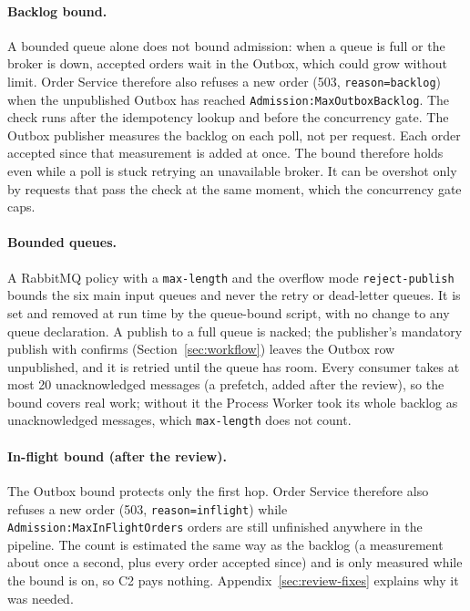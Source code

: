 \documentclass[a4paper]{report}
\begin{document}
\paragraph{Backlog bound.} A bounded queue alone does not bound admission:
when a queue is full or the broker is down, accepted orders wait in the
Outbox, which could grow without limit. Order Service therefore also refuses a
new order (503, \texttt{reason=backlog}) when the unpublished Outbox has
reached \texttt{Admission:\allowbreak MaxOutboxBacklog}. The check runs after
the idempotency lookup and before the concurrency gate. The Outbox publisher
measures the backlog on each poll, not per request. Each order accepted since that measurement
is added at once. The bound therefore
holds even while a poll is stuck retrying an unavailable broker. It can be
overshot only by requests that pass the check at the same moment, which the
concurrency gate caps.

\paragraph{Bounded queues.} A RabbitMQ policy with a
\texttt{max-length} and the overflow mode \texttt{reject-publish}~\cite{rmq-maxlength} bounds the six main input queues and never
the retry or dead-letter queues. It is set and removed at run time by
the queue-bound script, with no change to any queue declaration.
A publish to a full queue is nacked; the publisher's mandatory publish with
confirms (Section~\ref{sec:workflow}) leaves the Outbox row unpublished, and it
is retried until the queue has room. Every consumer takes at most 20
unacknowledged messages (a prefetch, added after the review), so the bound
covers real work; without it the Process Worker took its whole backlog as
unacknowledged messages, which \texttt{max-length} does not count.

\paragraph{In-flight bound (after the review).} The Outbox bound protects only
the first hop. Order Service therefore also refuses a new order (503,
\texttt{reason=inflight}) while \texttt{Admission:\allowbreak MaxInFlightOrders}
orders are still unfinished anywhere in the pipeline. The count is estimated
the same way as the backlog (a measurement about once a second, plus every
order accepted since) and is only measured while the bound is on, so C2 pays
nothing. Appendix~\ref{sec:review-fixes} explains why it was needed.
\end{document}
